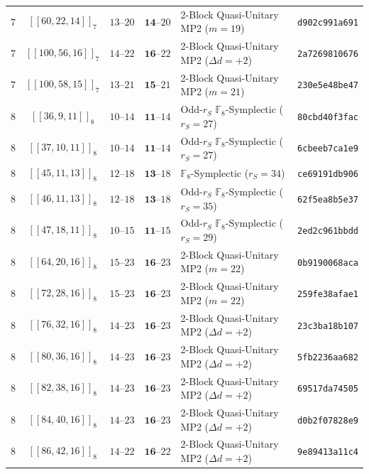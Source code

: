 \documentclass[11pt,a4paper]{article}
\theoremstyle{remark}
\begin{document}
\begin{table}[htbp]
{\begin{tabular}{@{}ccccll@{}}
$7$ & $[[60,22,14]]_{7}$ & $13\text{--}20$ & $\mathbf{14}\text{--}20$ & 2-Block Quasi-Unitary MP2 ($m=19$) & \texttt{d902c991a691} \\
$7$ & $[[100,56,16]]_{7}$ & $14\text{--}22$ & $\mathbf{16}\text{--}22$ & 2-Block Quasi-Unitary MP2 ($\Delta d = +2$) & \texttt{2a7269810676} \\
$7$ & $[[100,58,15]]_{7}$ & $13\text{--}21$ & $\mathbf{15}\text{--}21$ & 2-Block Quasi-Unitary MP2 ($m=21$) & \texttt{230e5e48be47} \\
\midrule
$8$ & $[[36,9,11]]_{8}$ & $10\text{--}14$ & $\mathbf{11}\text{--}14$ & Odd-$r_S$ $\mathbb{F}_{8}$-Symplectic ($r_S=27$) & \texttt{80cbd40f3fac} \\
$8$ & $[[37,10,11]]_{8}$ & $10\text{--}14$ & $\mathbf{11}\text{--}14$ & Odd-$r_S$ $\mathbb{F}_{8}$-Symplectic ($r_S=27$) & \texttt{6cbeeb7ca1e9} \\
$8$ & $[[45,11,13]]_{8}$ & $12\text{--}18$ & $\mathbf{13}\text{--}18$ & $\mathbb{F}_8$-Symplectic ($r_S=34$) & \texttt{ce69191db906} \\
$8$ & $[[46,11,13]]_{8}$ & $12\text{--}18$ & $\mathbf{13}\text{--}18$ & Odd-$r_S$ $\mathbb{F}_{8}$-Symplectic ($r_S=35$) & \texttt{62f5ea8b5e37} \\
$8$ & $[[47,18,11]]_{8}$ & $10\text{--}15$ & $\mathbf{11}\text{--}15$ & Odd-$r_S$ $\mathbb{F}_{8}$-Symplectic ($r_S=29$) & \texttt{2ed2c961bbdd} \\
$8$ & $[[64,20,16]]_{8}$ & $15\text{--}23$ & $\mathbf{16}\text{--}23$ & 2-Block Quasi-Unitary MP2 ($m=22$) & \texttt{0b9190068aca} \\
$8$ & $[[72,28,16]]_{8}$ & $15\text{--}23$ & $\mathbf{16}\text{--}23$ & 2-Block Quasi-Unitary MP2 ($m=22$) & \texttt{259fe38afae1} \\
$8$ & $[[76,32,16]]_{8}$ & $14\text{--}23$ & $\mathbf{16}\text{--}23$ & 2-Block Quasi-Unitary MP2 ($\Delta d = +2$) & \texttt{23c3ba18b107} \\
$8$ & $[[80,36,16]]_{8}$ & $14\text{--}23$ & $\mathbf{16}\text{--}23$ & 2-Block Quasi-Unitary MP2 ($\Delta d = +2$) & \texttt{5fb2236aa682} \\
$8$ & $[[82,38,16]]_{8}$ & $14\text{--}23$ & $\mathbf{16}\text{--}23$ & 2-Block Quasi-Unitary MP2 ($\Delta d = +2$) & \texttt{69517da74505} \\
$8$ & $[[84,40,16]]_{8}$ & $14\text{--}23$ & $\mathbf{16}\text{--}23$ & 2-Block Quasi-Unitary MP2 ($\Delta d = +2$) & \texttt{d0b2f07828e9} \\
$8$ & $[[86,42,16]]_{8}$ & $14\text{--}22$ & $\mathbf{16}\text{--}22$ & 2-Block Quasi-Unitary MP2 ($\Delta d = +2$) & \texttt{9e89413a11c4} \\
\bottomrule
\end{tabular}}
\end{table}
\end{document}
